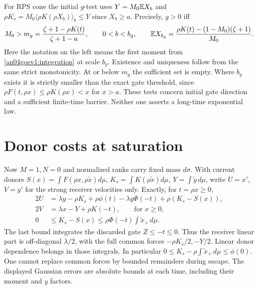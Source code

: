 \documentclass[11pt]{article}
\begin{document}
For RPS cone the initial \(g\)-test uses \(Y=M_0\mathbb E X_b\)
and \(\rho K_s=M_0\langle\rho K(\rho X_b)\rangle_b\le Y\) since
\(X_b\ge a\). Precisely, \(g>0\) iff
\[
 M_0>m_g=\frac{\zeta+1-\rho K(t)}{\zeta+1-a},\qquad
 0<b<b_g,\qquad
 \mathbb E X_{b_g}
 =\frac{\rho K(t)-(1-M_0)(\zeta+1)}{M_0}.
\]
Here the notation on the left means the first moment from
\eqref{an04goev1:integration} at scale \(b_g\).
Existence and uniqueness follow from the same strict monotonicity.
At or below \(m_g\) the sufficient set is empty. Where \(b_g\)
exists it is strictly smaller than the exact gate threshold, since
\(\rho F(t,\rho x)\le\rho K(\rho x)<x\) for \(x>a\).
These tests concern initial gate direction and a sufficient
finite-time barrier. Neither one asserts a long-time exponential law.

\section{Donor costs at saturation}\label{an04goev1:large}
Now \(M=1,N=0\) and normalized ranks carry fixed mass \(d\sigma\).
With current donors \(S(x)=\int F(\rho x,\rho\tilde x)d\mu\),
\(K_s=\int K(\rho\tilde x)d\mu,\ Y=\int\tilde y\,d\mu\), write
\(U=x'\), \(V=y'\) for the strong receiver velocities only. Exactly,
for \(t=\rho x\ge0\),
\begin{align*}
 2U &=\lambda y-\rho K_s+
       \rho\phi(t)-\lambda y\Phi(-t)+\rho(K_s-S(x)),\\
 2V &=\lambda x-Y+\rho K(-t),\qquad \text{for }x\ge0,\\
 0&\le K_s-S(x)\le \rho\Phi(-t)\int\tilde x_+\,d\mu .
\end{align*}
The last bound integrates the discarded gate \(Z\le-t\le0\).
Thus the receiver linear part is off-diagonal \(\lambda/2\), with
the full common forces \(-\rho K_s/2,-Y/2\). Linear donor dependence
belongs in those integrals. In particular
\(0\le K_s-\rho\int\tilde x_+\,d\mu\le\phi(0)\).
One cannot replace common forces by bounded remainders during escape.
The displayed Gaussian errors are absolute bounds at each time,
including their moment and \(y\) factors.
\end{document}

